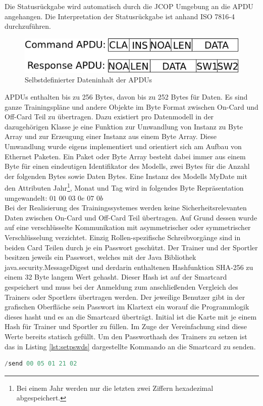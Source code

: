 Die Statusrückgabe wird automatisch durch die JCOP Umgebung an die APDU angehangen. Die Interpretation der Statusrückgabe ist anhand ISO 7816-4 durchzuführen.

\begin{figure}[htb]
\begin{center}
 \includegraphics[width=1\hsize]{./images/myapdu.png}
\end{center}
\caption[Selbstdefinierter Dateninhalt der APDUs]{\label{myapdu}Selbstdefinierter Dateninhalt der APDUs}
\end{figure}

APDUs enthalten bis zu 256 Bytes, davon bis zu 252 Bytes für Daten.
Es sind ganze Trainingspläne und andere Objekte im Byte Format zwischen On-Card und Off-Card Teil zu übertragen. Dazu existiert pro Datenmodell in der dazugehörigen Klasse je eine Funktion zur Umwandlung von Instanz zu Byte Array und zur Erzeugung einer Instanz aus einem Byte Array. Diese Umwandlung  wurde eigens implementiert und orientiert sich am Aufbau von Ethernet Paketen. Ein Paket oder Byte Array besteht dabei immer aus einem Byte für einen eindeutigen Identifikator des Modells, zwei Bytes für die Anzahl der folgenden Bytes sowie Daten Bytes.
Eine Instanz des Modells MyDate mit den Attributen Jahr\footnote{Bei einem Jahr werden nur die letzten zwei Ziffern hexadezimal abgespeichert.}, Monat und Tag wird in folgendes Byte Repräsentation umgewandelt: $01$ $00$ $03$ $0e$ $07$ $0b$
\\

Bei der Realisierung des Trainingssystemes werden keine Sicherheitsrelevanten Daten zwischen On-Card und Off-Card Teil übertragen. Auf Grund dessen wurde auf eine verschlüsselte Kommunikation mit asymmetrischer oder symmetrischer Verschlüsselung verzichtet.
Einzig Rollen-spezifische Schreibvorgänge sind in beiden Card Teilen durch je ein Passwort geschützt.
Der Trainer und der Sportler besitzen jeweils ein Passwort, welches mit der Java Bibliothek java.security.MessageDigest und derdarin enthaltenen  Hashfunktion SHA-256 zu einem 32 Byte langem Wert gehasht.
Dieser Hash ist auf der Smartcard gespeichert und muss bei der Anmeldung zum anschließenden Vergleich des Trainers oder Sportlers übertragen werden.
Der jeweilige Benutzer gibt in der grafischen Oberfläche sein Passwort im Klartext ein worauf die Programmlogik dieses hasht und es an die Smartcard überträgt.
Initial ist die Karte mit je einem Hash für Trainer und Sportler zu füllen. Im Zuge der Vereinfachung sind diese Werte bereits statisch gefüllt.
Um den Passworthash des Trainers zu setzen ist das in Listing \ref{lst:setpswds} dargestellte Kommando an die Smartcard zu senden.

\begin{lstlisting}[language=java, captionpos=b, caption=Setzen des Passwortes eines Sportlers in Form eines Kommandos, label=lst:setpswds]
/send 00 05 01 21 02 
\end{lstlisting}